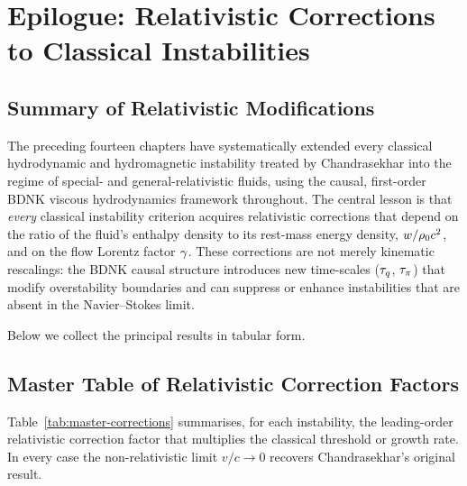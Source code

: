 
\chapter{Epilogue: Relativistic Corrections to Classical Instabilities}
\label{ch:epilogue}

\section{Summary of Relativistic Modifications}

The preceding fourteen chapters have systematically extended every classical
hydrodynamic and hydromagnetic instability treated by Chandrasekhar into the
regime of special- and general-relativistic fluids, using the causal,
first-order BDNK viscous hydrodynamics framework throughout.  The central
lesson is that \emph{every} classical instability criterion acquires
relativistic corrections that depend on the ratio of the fluid's enthalpy
density to its rest-mass energy density, $w / \rho_0 c^2$, and on
the flow Lorentz factor $\gamma$.  These corrections are not merely kinematic
rescalings: the BDNK causal structure introduces new time-scales
($\tau_{q}$, $\tau_{\pi}$) that modify overstability boundaries and can suppress or
enhance instabilities that are absent in the Navier--Stokes limit.

Below we collect the principal results in tabular form.

\section{Master Table of Relativistic Correction Factors}
\label{sec:master-table}

Table~\ref{tab:master-corrections} summarises, for each instability, the
leading-order relativistic correction factor that multiplies the classical
threshold or growth rate.  In every case the non-relativistic limit
$v/c \to 0$ recovers Chandrasekhar's original result.

